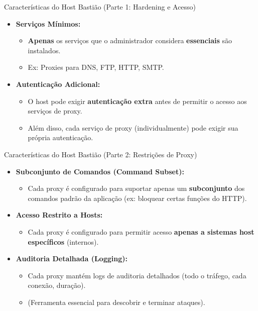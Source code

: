 \begin{frame}{Características do Host Bastião (Parte 1: Hardening e Acesso)}
    \begin{itemize}
        \item \textbf{Serviços Mínimos:}
              \begin{itemize}
                  \item \textbf{Apenas} os serviços que o administrador considera \textbf{essenciais} são instalados.
                  \item Ex: Proxies para DNS, FTP, HTTP, SMTP.
              \end{itemize}

        \item \textbf{Autenticação Adicional:}
              \begin{itemize}
                  \item O host pode exigir \textbf{autenticação extra} antes de permitir o acesso aos serviços de proxy.
                  \item Além disso, cada serviço de proxy (individualmente) pode exigir sua própria autenticação.
              \end{itemize}
    \end{itemize}
\end{frame}

\begin{frame}{Características do Host Bastião (Parte 2: Restrições de Proxy)}
    \begin{itemize}
        \item \textbf{Subconjunto de Comandos (Command Subset):}
              \begin{itemize}
                  \item Cada proxy é configurado para suportar apenas um \textbf{subconjunto} dos comandos padrão da aplicação (ex: bloquear certas funções do HTTP).
              \end{itemize}

        \item \textbf{Acesso Restrito a Hosts:}
              \begin{itemize}
                  \item Cada proxy é configurado para permitir acesso \textbf{apenas a sistemas host específicos} (internos).
              \end{itemize}

        \item \textbf{Auditoria Detalhada (Logging):}
              \begin{itemize}
                  \item Cada proxy mantém logs de auditoria detalhados (todo o tráfego, cada conexão, duração).
                  \item (Ferramenta essencial para descobrir e terminar ataques).
              \end{itemize}
    \end{itemize}
\end{frame}

